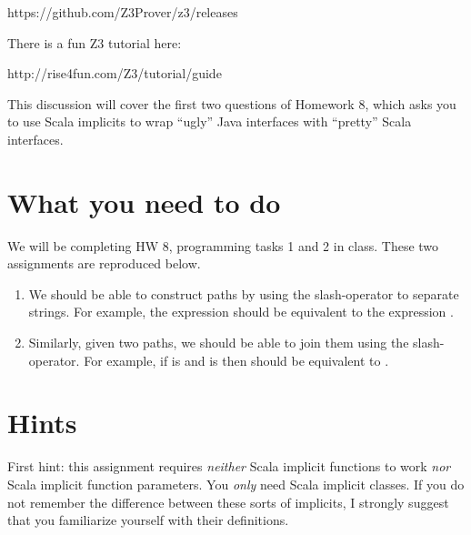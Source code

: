 \documentclass[9pt]{extbook}
\begin{document}
https://github.com/Z3Prover/z3/releases
 
There is a fun Z3 tutorial here:
 
http://rise4fun.com/Z3/tutorial/guide


















This discussion will cover the first two questions of Homework 8, which asks you to use Scala implicits to wrap ``ugly'' Java interfaces with ``pretty'' Scala interfaces.

\section{What you need to do}

We will be completing HW 8, programming tasks 1 and 2 in class.  These two assignments are reproduced below.

\begin{enumerate}

  \item We should be able to construct paths by using the slash-operator to separate strings. For example, the expression  should be equivalent to the expression . 
  \item Similarly, given two paths, we should be able to join them using the slash-operator. For example, if  is  and  is  then  should be equivalent to . 
\end{enumerate}

\section{Hints}

First hint: this assignment requires \emph{neither} Scala implicit functions to work \emph{nor} Scala implicit function parameters.  You \emph{only} need Scala implicit classes.  If you do not remember the difference between these sorts of implicits, I strongly suggest that you familiarize yourself with their definitions.
\end{document}
